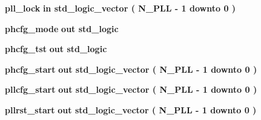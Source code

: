 \begin{DoxyCompactItemize}
\item 
{\bf pll\+\_\+lock}  {\bfseries {\bfseries \textcolor{keywordflow}{in}\textcolor{vhdlchar}{ }}} {\bfseries \textcolor{comment}{std\+\_\+logic\+\_\+vector}\textcolor{vhdlchar}{ }\textcolor{vhdlchar}{(}\textcolor{vhdlchar}{ }\textcolor{vhdlchar}{ }\textcolor{vhdlchar}{ }\textcolor{vhdlchar}{ }{\bfseries {\bf N\+\_\+\+P\+LL}} \textcolor{vhdlchar}{-\/}\textcolor{vhdlchar}{ } \textcolor{vhdldigit}{1} \textcolor{vhdlchar}{ }\textcolor{keywordflow}{downto}\textcolor{vhdlchar}{ }\textcolor{vhdlchar}{ } \textcolor{vhdldigit}{0} \textcolor{vhdlchar}{ }\textcolor{vhdlchar}{)}\textcolor{vhdlchar}{ }} 
\item 
{\bf phcfg\+\_\+mode}  {\bfseries {\bfseries \textcolor{keywordflow}{out}\textcolor{vhdlchar}{ }}} {\bfseries \textcolor{comment}{std\+\_\+logic}\textcolor{vhdlchar}{ }} 
\item 
{\bf phcfg\+\_\+tst}  {\bfseries {\bfseries \textcolor{keywordflow}{out}\textcolor{vhdlchar}{ }}} {\bfseries \textcolor{comment}{std\+\_\+logic}\textcolor{vhdlchar}{ }} 
\item 
{\bf phcfg\+\_\+start}  {\bfseries {\bfseries \textcolor{keywordflow}{out}\textcolor{vhdlchar}{ }}} {\bfseries \textcolor{comment}{std\+\_\+logic\+\_\+vector}\textcolor{vhdlchar}{ }\textcolor{vhdlchar}{(}\textcolor{vhdlchar}{ }\textcolor{vhdlchar}{ }\textcolor{vhdlchar}{ }\textcolor{vhdlchar}{ }{\bfseries {\bf N\+\_\+\+P\+LL}} \textcolor{vhdlchar}{-\/}\textcolor{vhdlchar}{ } \textcolor{vhdldigit}{1} \textcolor{vhdlchar}{ }\textcolor{keywordflow}{downto}\textcolor{vhdlchar}{ }\textcolor{vhdlchar}{ } \textcolor{vhdldigit}{0} \textcolor{vhdlchar}{ }\textcolor{vhdlchar}{)}\textcolor{vhdlchar}{ }} 
\item 
{\bf pllcfg\+\_\+start}  {\bfseries {\bfseries \textcolor{keywordflow}{out}\textcolor{vhdlchar}{ }}} {\bfseries \textcolor{comment}{std\+\_\+logic\+\_\+vector}\textcolor{vhdlchar}{ }\textcolor{vhdlchar}{(}\textcolor{vhdlchar}{ }\textcolor{vhdlchar}{ }\textcolor{vhdlchar}{ }\textcolor{vhdlchar}{ }{\bfseries {\bf N\+\_\+\+P\+LL}} \textcolor{vhdlchar}{-\/}\textcolor{vhdlchar}{ } \textcolor{vhdldigit}{1} \textcolor{vhdlchar}{ }\textcolor{keywordflow}{downto}\textcolor{vhdlchar}{ }\textcolor{vhdlchar}{ } \textcolor{vhdldigit}{0} \textcolor{vhdlchar}{ }\textcolor{vhdlchar}{)}\textcolor{vhdlchar}{ }} 
\item 
{\bf pllrst\+\_\+start}  {\bfseries {\bfseries \textcolor{keywordflow}{out}\textcolor{vhdlchar}{ }}} {\bfseries \textcolor{comment}{std\+\_\+logic\+\_\+vector}\textcolor{vhdlchar}{ }\textcolor{vhdlchar}{(}\textcolor{vhdlchar}{ }\textcolor{vhdlchar}{ }\textcolor{vhdlchar}{ }\textcolor{vhdlchar}{ }{\bfseries {\bf N\+\_\+\+P\+LL}} \textcolor{vhdlchar}{-\/}\textcolor{vhdlchar}{ } \textcolor{vhdldigit}{1} \textcolor{vhdlchar}{ }\textcolor{keywordflow}{downto}\textcolor{vhdlchar}{ }\textcolor{vhdlchar}{ } \textcolor{vhdldigit}{0} \textcolor{vhdlchar}{ }\textcolor{vhdlchar}{)}\textcolor{vhdlchar}{ }} 

\end{DoxyCompactItemize}
